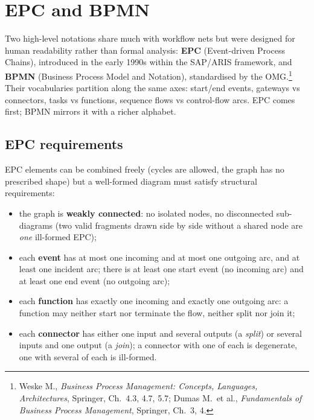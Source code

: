 \section{EPC and BPMN}

Two high-level notations share much with workflow nets but were designed for human readability rather than formal analysis: \textbf{EPC} (Event-driven Process Chains), introduced in the early 1990s within the SAP/ARIS framework, and \textbf{BPMN} (Business Process Model and Notation), standardised by the OMG.\footnote{Weske M., \emph{Business Process Management: Concepts, Languages, Architectures}, Springer, Ch.~4.3, 4.7, 5.7; Dumas M.\ et al., \emph{Fundamentals of Business Process Management}, Springer, Ch.~3, 4.} Their vocabularies partition along the same axes: start/end events, gateways vs connectors, tasks vs functions, sequence flows vs control-flow arcs. EPC comes first; BPMN mirrors it with a richer alphabet.

\subsection{EPC requirements}

EPC elements can be combined freely (cycles are allowed, the graph has no prescribed shape) but a well-formed diagram must satisfy structural requirements:
\begin{itemize}
  \item the graph is \textbf{weakly connected}: no isolated nodes, no disconnected sub-diagrams (two valid fragments drawn side by side without a shared node are \emph{one} ill-formed EPC);
  \item each \textbf{event} has at most one incoming and at most one outgoing arc, and at least one incident arc; there is at least one start event (no incoming arc) and at least one end event (no outgoing arc);
  \item each \textbf{function} has exactly one incoming and exactly one outgoing arc: a function may neither start nor terminate the flow, neither split nor join it;
  \item each \textbf{connector} has either one input and several outputs (a \emph{split}) or several inputs and one output (a \emph{join}); a connector with one of each is degenerate, one with several of each is ill-formed.
\end{itemize}

